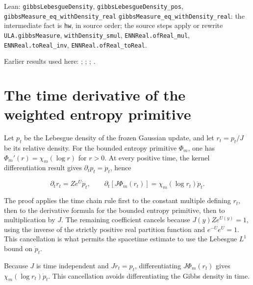 \documentclass[11pt,a4paper]{article}
\begin{document}
\begin{leanbox}{Lean: \texttt{gibbsLebesgueDensity}, \texttt{gibbsLebesgueDensity\_\allowbreak{}pos}, \texttt{gibbsMeasure\_\allowbreak{}eq\_\allowbreak{}withDensity\_\allowbreak{}real}}
\texttt{gibbs\allowbreak{}Measure\_\allowbreak{}eq\_\allowbreak{}with\allowbreak{}Density\_\allowbreak{}real}: the intermediate fact is \texttt{hw}, in source order; the source steps apply or rewrite \texttt{ULA.\allowbreak{}gibbs\allowbreak{}Measure}, \texttt{with\allowbreak{}Density\_\allowbreak{}smul}, \texttt{ENNReal.\allowbreak{}of\allowbreak{}Real\_\allowbreak{}mul}, \texttt{ENNReal.\allowbreak{}to\allowbreak{}Real\_\allowbreak{}inv}, \texttt{ENNReal.\allowbreak{}of\allowbreak{}Real\_\allowbreak{}to\allowbreak{}Real}.
\end{leanbox}


Earlier results used here: \cite[Section~3.26.1]{LangevinLean2026ULASC}; \cite[Section~3.26.2]{LangevinLean2026ULASC}; \cite[Section~3.26.3]{LangevinLean2026ULASC}; \cite[Section~3.26.9]{LangevinLean2026ULASC}.

\section{\texorpdfstring{The time derivative of the weighted entropy primitive}{The time derivative of the weighted entropy primitive}}


Let \(p_t\) be the Lebesgue density of the frozen Gaussian update, and let \(r_t=p_t/J\) be its relative density. For the bounded entropy primitive \(\Phi_m\), one has \(\Phi_m'(r)=\chi_m(\log r)\) for \(r>0\). At every positive time, the kernel differentiation result gives \(\partial_t p_t=\dot p_t\), hence

\[\partial_t r_t=Ze^{U}\dot p_t,\qquad \partial_t[J\Phi_m(r_t)]=\chi_m(\log r_t)\dot p_t.\]

The proof applies the time chain rule first to the constant multiple defining \(r_t\), then to the derivative formula for the bounded entropy primitive, then to multiplication by \(J\). The remaining coefficient cancels because \(J(y)Ze^{U(y)}=1\), using the inverse of the strictly positive real partition function and \(e^{-U}e^U=1\). This cancellation is what permits the spacetime estimate to use the Lebesgue \(L^1\) bound on \(\dot p_t\).



Because \(J\) is time independent and \(Jr_t=p_t\), differentiating \(J\Phi_m(r_t)\) gives \(\chi_m(\log r_t)\dot p_t\). This cancellation avoids differentiating the Gibbs density in time.
\end{document}
